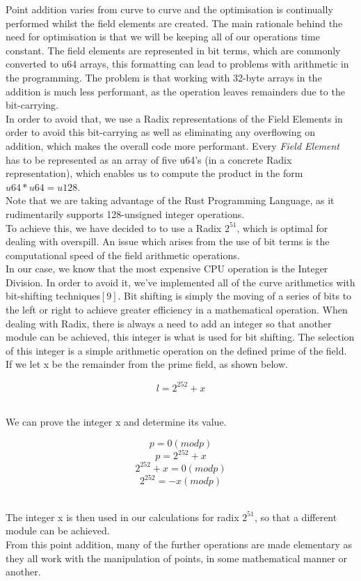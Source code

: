 \documentclass[letterpaper, 10 pt, conference]{ieeeconf}  %
\begin{document}
Point addition varies from curve to curve and the optimisation is continually performed whilst the field elements are created. The main rationale behind the need for optimisation is that we will be keeping all of our operations time constant. The field elements are represented in bit terms, which are commonly converted to u64 arrays, this formatting can lead to problems with arithmetic in the programming.  The problem is that working with 32-byte arrays in the addition is much less performant, as the operation leaves remainders due to the bit-carrying.\\
In order to avoid that, we use a Radix representations of the Field Elements in order to avoid this bit-carrying as well as eliminating any overflowing on addition, which makes the overall code more performant. Every \textit{Field Element} has to be represented as an array of five u64's (in a concrete Radix representation), which enables us to compute the product in the form $ u64 * u64 = u128 $.\\  Note that we are taking advantage of the Rust Programming Language, as it rudimentarily supports 128-unsigned integer operations.
\\
To achieve this, we have decided to to use a Radix $ 2^{51} $, which is optimal for dealing with overspill. An issue which arises from the use of bit terms is the computational speed of the field arithmetic operations. \\
In our case, we know that the most expensive CPU operation is the Integer Division. In order to avoid it, we've implemented all of the curve arithmetics with bit-shifting techniques$[9]$. Bit shifting is simply the moving of a series of bits to the left or right to achieve greater efficiency in a mathematical operation. When dealing with Radix, there is always a need to add an integer so that another module can be achieved, this integer is what is used for bit shifting. The selection of this integer is a simple arithmetic operation on the defined prime of the field. 
If we let x be the remainder from the prime field, as shown below.\

$$ l = 2^{252}+x $$\

We can prove the integer x and determine its value.\

        $$ p = 0(modp) $$  
        $$ p = 2^{252}+x $$
$$ 2^{252}+x = 0(modp) $$
  $$ 2^{252} = -x(modp) $$ \

The integer x is then used in our calculations for radix $ 2^{51} $, so that a different module can be achieved. \\ 
From this point addition, many of the further operations are made elementary as they all work with the manipulation of points, in some mathematical manner or another.  
\end{document}
